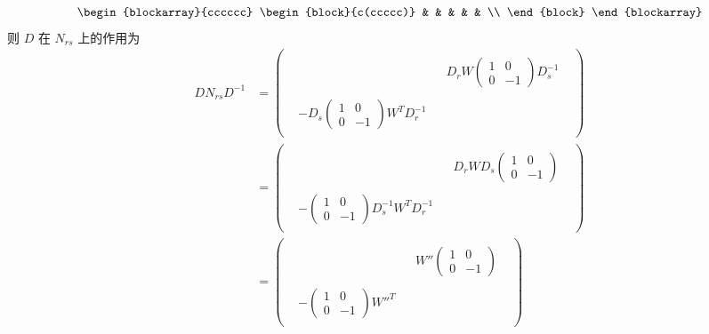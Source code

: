 \begin{example}[偶数阶特殊正交群 $SO(2n)$]
\begin{equation*}
\begin{blockarray}{cccccc}
\begin{block}{c(ccccc)}
            & & & & & \\
        \end{block}
        \end{blockarray}
    \end{equation*}
    则 $D$ 在 $N_{rs}$ 上的作用为
    \begin{align*}
        D N_{rs} D^{-1} & = 
        \begin{pmatrix}
        & & & & \\
        & & & D_r W \begin{pmatrix} 1 & 0 \\ 0 & -1 \end{pmatrix} D_s^{-1} & \\
        & & & & \\
        & -D_s \begin{pmatrix} 1 & 0 \\ 0 & -1 \end{pmatrix} {W}^T D_r^{-1} & & & \\
        & & & &
        \end{pmatrix} \\ 
        & = 
        \begin{pmatrix}
        & & & & \\
        & & & D_r W D_s \begin{pmatrix} 1 & 0 \\ 0 & -1 \end{pmatrix} & \\
        & & & & \\
        & -\begin{pmatrix} 1 & 0 \\ 0 & -1 \end{pmatrix} D_s^{-1} {W}^T D_r^{-1} & & & \\
        & & & &
        \end{pmatrix} \\
        & = 
        \begin{pmatrix}
        & & & & \\
        & & & W'' \begin{pmatrix} 1 & 0 \\ 0 & -1 \end{pmatrix} & \\
        & & & & \\
        & -\begin{pmatrix} 1 & 0 \\ 0 & -1 \end{pmatrix} {W''}^T & & & \\

\end{pmatrix}
\end{align*}
\end{example}

